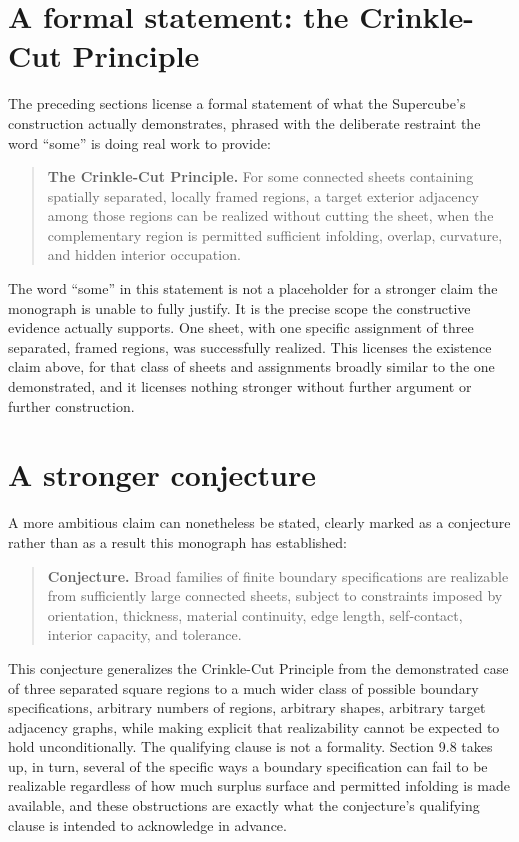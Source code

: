 \documentclass[11pt,oneside]{book}
\begin{document}
\hypertarget{a-formal-statement-the-crinkle-cut-principle}{%
\section{A formal statement: the Crinkle-Cut
Principle}\label{a-formal-statement-the-crinkle-cut-principle}}

The preceding sections license a formal statement of what the
Supercube's construction actually demonstrates, phrased with the
deliberate restraint the word ``some'' is doing real work to provide:

\begin{quote}
\textbf{The Crinkle-Cut Principle.} For some connected sheets containing
spatially separated, locally framed regions, a target exterior adjacency
among those regions can be realized without cutting the sheet, when the
complementary region is permitted sufficient infolding, overlap,
curvature, and hidden interior occupation.
\end{quote}

The word ``some'' in this statement is not a placeholder for a stronger
claim the monograph is unable to fully justify. It is the precise scope
the constructive evidence actually supports. One sheet, with one
specific assignment of three separated, framed regions, was successfully
realized. This licenses the existence claim above, for that class of
sheets and assignments broadly similar to the one demonstrated, and it
licenses nothing stronger without further argument or further
construction.

\hypertarget{a-stronger-conjecture}{%
\section{A stronger conjecture}\label{a-stronger-conjecture}}

A more ambitious claim can nonetheless be stated, clearly marked as a
conjecture rather than as a result this monograph has established:

\begin{quote}
\textbf{Conjecture.} Broad families of finite boundary specifications
are realizable from sufficiently large connected sheets, subject to
constraints imposed by orientation, thickness, material continuity, edge
length, self-contact, interior capacity, and tolerance.
\end{quote}

This conjecture generalizes the Crinkle-Cut Principle from the
demonstrated case of three separated square regions to a much wider
class of possible boundary specifications, arbitrary numbers of regions,
arbitrary shapes, arbitrary target adjacency graphs, while making
explicit that realizability cannot be expected to hold unconditionally.
The qualifying clause is not a formality. Section 9.8 takes up, in turn,
several of the specific ways a boundary specification can fail to be
realizable regardless of how much surplus surface and permitted
infolding is made available, and these obstructions are exactly what the
conjecture's qualifying clause is intended to acknowledge in advance.
\end{document}
